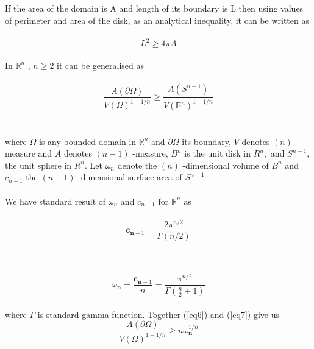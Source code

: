 \documentclass[oneside]{book}
\begin{document}
    If the area of the domain is A and length of its boundary is L then using values of perimeter and area of the disk,
    as an analytical inequality, it can be written as \\\\
    \begin{equation}
    \label{eq5}  
    L^{2} \geq 4 \pi A
        \end{equation}
      \\
        In $\mathbb{R}^{n}$ 
        , $n \geq 2$  it can be generalised as
        \\\\
       \begin{equation}
       \label{eq6}  
             \frac{A(\partial \Omega)}{V(\Omega)^{1-1 / n}} \geq \frac{A\left(S^{n-1}\right)}{V\left(\mathbb{B}^{n}\right)^{1-1 / n}}
          \end{equation} \\\\
        where $\Omega$ is any bounded domain in $\mathbb{R}^{n}$ and $\partial \Omega$ its boundary, $V$ denotes $(n) $
measure and $A$ denotes $(n-1)$ -measure, $B^{n}$ is the unit disk in $R^{n},$ and $S^{n-1}$,
the unit sphere in $R^{n}$.
Let $\omega_{n}$ denote the $(n)$ -dimensional volume of $B^{n}$ and  $c_{n-1}$ the $(n-1)$ -dimensional surface area of $S^{n-1}$ \\\\



We have standard result of $\omega_{n}$ and $c_{n-1}$ for $\mathbb{R}^{n}$ as  \\\\
    \begin{equation}
    \label{eq7}  
\mathbf{c}_{\mathbf{n}-1} = \frac{2 \pi^{n / 2}}{\Gamma(n / 2)}
    \end{equation}


\\\\

        \begin{equation}
        \label{eq8}  
 \omega_{\mathbf{n} } = \frac{\mathbf{c}_{\mathbf{n}-1}}{n} =\frac{\pi^{n / 2}}{\Gamma\left(\frac{n}{2}+1\right)}
    \end{equation} \\
    where $\Gamma$ is standard gamma function. Together (\ref{eq6}) and 
(\ref{eq7}) give us \\
    \begin{equation}
    \label{eq9}  
 \frac{A(\partial \Omega)}{V(\Omega)^{1-1 / n}} \geq n \omega_{\mathbf{n}}^{1 / n}
    \end{equation}
\end{document}
